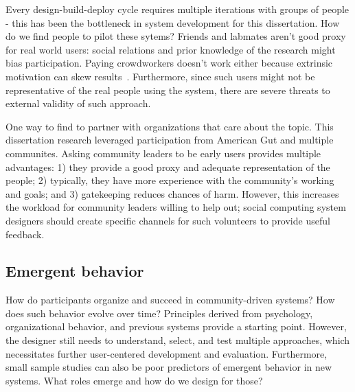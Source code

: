 

Every design-build-deploy cycle requires multiple iterations with groups of people - this has been the bottleneck in system development for this dissertation. How do we find people to pilot these sytems? Friends and labmates aren't good proxy for real world users: social relations and prior knowledge of the research might bias participation. Paying crowdworkers doesn't work either because extrinsic motivation can skew results~\cite{Chandler2013}. Furthermore, since such users might not be representative of the real people using the system, there are severe threats to external validity of such approach.

One way to find to partner with organizations that care about the topic. This dissertation research leveraged participation from American Gut and multiple communites. Asking community leaders to be early users provides multiple advantages: 1) they provide a good proxy and adequate representation of the people; 2) typically, they have more experience with the community's working and goals; and 3) gatekeeping reduces chances of harm. However, this increases the workload for community leaders willing to help out; social computing system designers should create specific channels for such volunteers to provide useful feedback.

\subsection{Emergent behavior}
How do participants organize and succeed in community-driven systems? How does such behavior evolve over time? Principles derived from psychology, organizational behavior, and previous systems provide a starting point. However, the designer still needs to understand, select, and test multiple approaches, which necessitates further user-centered development and evaluation. Furthermore, small sample studies can also be poor predictors of emergent behavior in new systems. What roles emerge and how do we design for those?

